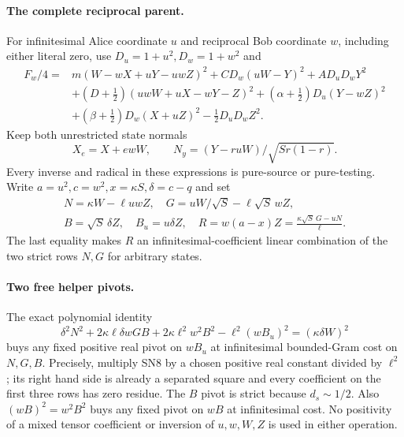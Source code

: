 \paragraph{The complete reciprocal parent.}
For infinitesimal Alice coordinate $u$ and reciprocal Bob coordinate
$w$, including either literal zero, use $D_u=1+u^2,D_w=1+w^2$ and
\[
\begin{split}
 F_w/4={}&m(W-wX+uY-uwZ)^2+CD_w(uW-Y)^2+AD_uD_wY^2\\
 &+(D+\tfrac12)(uwW+uX-wY-Z)^2
 +(\alpha+\tfrac12)D_u(Y-wZ)^2\\
 &+(\beta+\tfrac12)D_w(X+uZ)^2-\tfrac12D_uD_wZ^2.
\end{split}\tag{SN5}
\]
Keep both unrestricted state normals
\[
 X_e=X+ewW,\qquad N_y=(Y-ruW)/\sqrt{Sr(1-r)}.
 \tag{SN6}
\]
Every inverse and radical in these expressions is pure-source or
pure-testing. Write $a=u^2,c=w^2,x=\kappa S,\delta=c-q$ and set
\[
\begin{gathered}
 N=\kappa W-\ell uwZ,\quad G=uW/\sqrt S-\ell\sqrt S\,wZ,\\
 B=\sqrt S\,\delta Z,\quad B_u=u\delta Z,\quad
 R=w(a-x)Z=\frac{\kappa\sqrt S\,G-uN}{\ell}.
\end{gathered}\tag{SN7}
\]
The last equality makes $R$ an infinitesimal-coefficient linear
combination of the two strict rows $N,G$ for arbitrary states.

\paragraph{Two free helper pivots.}
The exact polynomial identity
\[
 \delta^2N^2+2\kappa\ell\delta wGB
       +2\kappa\ell^2w^2B^2-\ell^2(wB_u)^2
                  =(\kappa\delta W)^2
 \tag{SN8}
\]
buys any fixed positive real pivot on $wB_u$ at infinitesimal
bounded-Gram cost on $N,G,B$. Precisely, multiply SN8 by a chosen
positive real constant divided by $\ell^2$; its right hand side is
already a separated square and every coefficient on the first three
rows has zero residue. The $B$ pivot is strict because $d_s\sim1/2$.
Also $(wB)^2=w^2B^2$ buys any fixed pivot on $wB$ at infinitesimal
cost. No positivity of a mixed tensor coefficient or inversion of
$u,w,W,Z$ is used in either operation.

